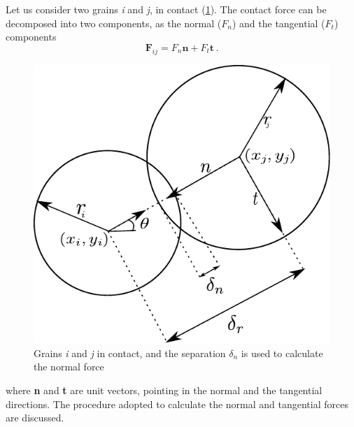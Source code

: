 Let us consider two grains \textit{i} and \textit{j}, in contact 
(\cref{fig:DEM}). The contact force can be decomposed into two components, 
as the normal ($\mathit{F}_{n}$) and the tangential ($\mathit{F}_{t}$) 
components
%
\begin{equation}
 \mathbf{F}_{ij}=F_{n}\mathbf{n}+F_{t}\mathbf{t} \,.
\label{eq:fnt}
\end{equation}

\begin{figure}[htbp]
	\centering
	\includegraphics{DEM}
	\caption[Calculation of normal force]{Grains \textit{i} and \textit{j} in 
	contact, and the 
	separation $\delta_{n}$ is used to calculate the normal force} 
	\label{fig:DEM}
\end{figure}

where \textbf{n} and \textbf{t} are unit vectors, pointing in the normal and 
the tangential directions. The procedure adopted to calculate the normal and 
tangential forces are discussed.

